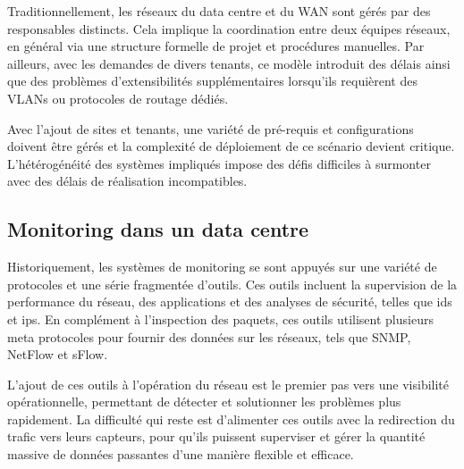 Traditionnellement,  les réseaux du data centre et du WAN sont gérés  par des responsables distincts. Cela implique la coordination entre deux équipes réseaux, en général via une structure formelle de projet et procédures manuelles. Par ailleurs, avec les demandes de divers tenants, ce modèle introduit des délais ainsi que des problèmes d'extensibilités supplémentaires lorsqu'ils requièrent des VLANs ou protocoles de routage dédiés.

Avec l'ajout de sites et tenants, une variété de pré-requis et configurations doivent être gérés et la complexité de déploiement de ce scénario devient critique. L'hétérogénéité des systèmes impliqués impose des défis difficiles à surmonter avec des délais de réalisation incompatibles. \cite{leveragingSDNCloudDCWAN} \cite{zkCloudIntelligentNetwork}


\subsection*{Monitoring dans un data centre}

Historiquement, les systèmes de monitoring se sont appuyés sur une variété de protocoles et une série fragmentée d'outils. Ces outils incluent la supervision de la performance du réseau, des applications et des analyses de sécurité, telles que \gls{ids} et \gls{ips}. En complément à l'inspection des paquets, ces outils utilisent plusieurs meta protocoles pour fournir des données sur les réseaux, tels que SNMP, NetFlow et sFlow.

L'ajout de ces outils à l'opération du réseau est le premier pas vers une visibilité opérationnelle, permettant de détecter et solutionner les problèmes plus rapidement. La difficulté qui reste est d'alimenter ces outils avec la redirection du trafic vers leurs capteurs, pour qu'ils puissent superviser et gérer la quantité massive de données passantes d'une manière flexible et efficace. 


